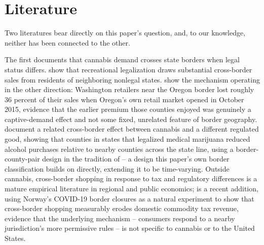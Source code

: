 \documentclass[12pt]{article}
\begin{document}
\section{Literature}
\label{sec:lit}

Two literatures bear directly on this paper's question, and, to our knowledge, neither has been connected to
the other.

The first documents that cannabis demand crosses state borders when legal status differs. \citet{HaoCowan2020}
show that recreational legalization draws substantial cross-border sales from residents of neighboring
nonlegal states. \citet{HansenMillerWeber2020} show the mechanism operating in the other direction: Washington
retailers near the Oregon border lost roughly 36 percent of their sales when Oregon's own retail market opened
in October 2015, evidence that the earlier premium those counties enjoyed was genuinely a captive-demand effect
and not some fixed, unrelated feature of border geography. \citet{BaggioChongKwon2020} document a related
cross-border effect between cannabis and a different regulated good, showing that counties in states that
legalized medical marijuana reduced alcohol purchases relative to nearby counties across the state line, using
a border-county-pair design in the tradition of \citet{DubeLesterReich2010} -- a design this paper's own border
classification builds on directly, extending it to be time-varying. Outside cannabis, cross-border shopping in
response to tax and regulatory differences is a mature empirical literature in regional and public economics;
\citet{FribergEtAl2024} is a recent addition, using Norway's COVID-19 border closures as a natural experiment
to show that cross-border shopping measurably erodes domestic commodity tax revenue, evidence that the
underlying mechanism -- consumers respond to a nearby jurisdiction's more permissive rules -- is not specific
to cannabis or to the United States.
\end{document}
